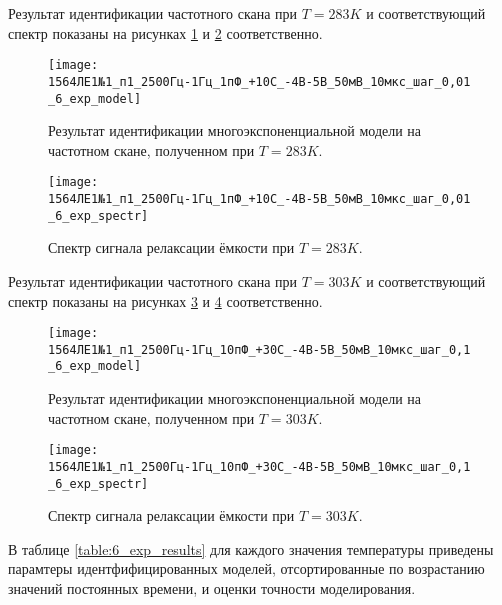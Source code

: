 	Результат идентификации частотного скана при $T=283 K$ и соответствующий
	спектр показаны на рисунках \ref{pic:6_exp_model_283} и 
	\ref{pic:6_exp_spectr_283} соответственно.

	\begin{figure}[!htp]
		\centering
		\texttt{[image: 1564ЛЕ1№1\_п1\_2500Гц-1Гц\_1пФ\_+10С\_-4В-5В\_50мВ\_10мкс\_шаг\_0,01\_6\_exp\_model]}
		\caption{Результат идентификации многоэкспоненциальной модели на 
		частотном скане, полученном при $T=283 K$.}
		\label{pic:6_exp_model_283}
	\end{figure}

	\begin{figure}[!htp]
		\centering
		\texttt{[image: 1564ЛЕ1№1\_п1\_2500Гц-1Гц\_1пФ\_+10С\_-4В-5В\_50мВ\_10мкс\_шаг\_0,01\_6\_exp\_spectr]}
		\caption{Спектр сигнала релаксации ёмкости при $T=283 K$.}
		\label{pic:6_exp_spectr_283}
	\end{figure}

	Результат идентификации частотного скана при $T=303 K$ и соответствующий
	спектр показаны на рисунках \ref{pic:6_exp_model_303} и 
	\ref{pic:6_exp_spectr_303} соответственно.

	\begin{figure}[!htp]
		\centering
		\texttt{[image: 1564ЛЕ1№1\_п1\_2500Гц-1Гц\_10пФ\_+30С\_-4В-5В\_50мВ\_10мкс\_шаг\_0,1\_6\_exp\_model]}
		\caption{Результат идентификации многоэкспоненциальной модели на 
		частотном скане, полученном при $T=303 K$.}
		\label{pic:6_exp_model_303}
	\end{figure}

	\begin{figure}[!htp]
		\centering
		\texttt{[image: 1564ЛЕ1№1\_п1\_2500Гц-1Гц\_10пФ\_+30С\_-4В-5В\_50мВ\_10мкс\_шаг\_0,1\_6\_exp\_spectr]}
		\caption{Спектр сигнала релаксации ёмкости при $T=303 K$.}
		\label{pic:6_exp_spectr_303}
	\end{figure}

	В таблице \ref{table:6_exp_results} для каждого значения температуры 
	приведены парамтеры идентфифицированных моделей, отсортированные по 
	возрастанию значений постоянных времени, и оценки точности моделирования.

